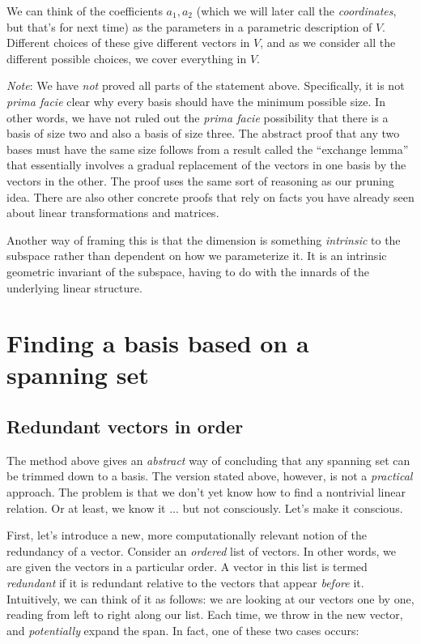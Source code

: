 \documentclass[10pt]{amsart}
\begin{document}
We can think of the coefficients $a_1,a_2$ (which we will later call
the {\em coordinates}, but that's for next time) as the parameters in
a parametric description of $V$. Different choices of these give
different vectors in $V$, and as we consider all the different
possible choices, we cover everything in $V$.

{\em Note}: We have {\em not} proved all parts of the statement
above. Specifically, it is not {\em prima facie} clear why every basis
should have the minimum possible size. In other words, we have not
ruled out the {\em prima facie} possibility that there is a basis of
size two and also a basis of size three. The abstract proof that any
two bases must have the same size follows from a result called the
``exchange lemma'' that essentially involves a gradual replacement of
the vectors in one basis by the vectors in the other. The proof uses
the same sort of reasoning as our pruning idea. There are also other
concrete proofs that rely on facts you have already seen about linear
transformations and matrices.

Another way of framing this is that the dimension is something {\em
  intrinsic} to the subspace rather than dependent on how we
parameterize it. It is an intrinsic geometric invariant of the
subspace, having to do with the innards of the underlying linear
structure.
\section{Finding a basis based on a spanning set}

\subsection{Redundant vectors in order}

The method above gives an {\em abstract} way of concluding that any
spanning set can be trimmed down to a basis. The version stated above,
however, is not a {\em practical} approach. The problem is that we
don't yet know how to find a nontrivial linear relation. Or at least,
we know it ... but not consciously. Let's make it conscious.

First, let's introduce a new, more computationally relevant notion of
the redundancy of a vector. Consider an {\em ordered} list of
vectors. In other words, we are given the vectors in a particular
order. A vector in this list is termed {\em redundant} if it is
redundant relative to the vectors that appear {\em before}
it. Intuitively, we can think of it as follows: we are looking at our
vectors one by one, reading from left to right along our list. Each
time, we throw in the new vector, and {\em potentially} expand the
span. In fact, one of these two cases occurs:
\end{document}
